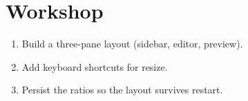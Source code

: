 \section*{Workshop}

\begin{enumerate}[leftmargin=*]
  \item Build a three-pane layout (sidebar, editor,
    preview).
  \item Add keyboard shortcuts for resize.
  \item Persist the ratios so the layout survives
    restart.
\end{enumerate}
